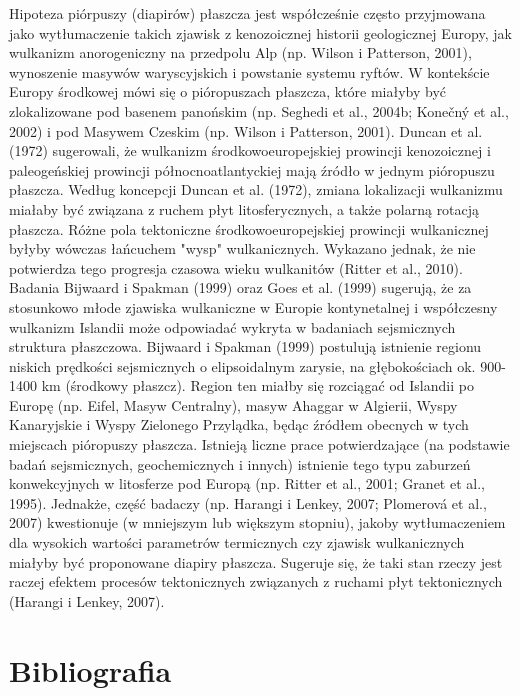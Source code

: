 \documentclass[11.5pt,twoside]{report}
\begin{document}
Hipoteza piórpuszy (diapirów) płaszcza jest współcześnie często przyjmowana jako wytłumaczenie takich zjawisk z kenozoicznej historii geologicznej Europy, jak wulkanizm anorogeniczny na przedpolu Alp (np. Wilson i Patterson, 2001), wynoszenie masywów waryscyjskich i powstanie systemu ryftów. W kontekście Europy środkowej mówi się o pióropuszach płaszcza, które miałyby być zlokalizowane pod basenem panońskim (np. Seghedi et al., 2004b; Konečn\'{y} et al., 2002) i pod Masywem Czeskim (np. Wilson i Patterson, 2001). Duncan et al. (1972) sugerowali, że wulkanizm środkowoeuropejskiej prowincji kenozoicznej i paleogeńskiej prowincji północnoatlantyckiej mają \'{z}ródło w jednym pióropuszu płaszcza. Według koncepcji Duncan et al. (1972), zmiana lokalizacji wulkanizmu miałaby być związana z ruchem płyt litosferycznych, a także polarną rotacją płaszcza. Różne pola tektoniczne środkowoeuropejskiej prowincji wulkanicznej byłyby wówczas łańcuchem "wysp" wulkanicznych. Wykazano jednak, że nie potwierdza tego progresja czasowa wieku wulkanitów (Ritter et al., 2010). Badania Bijwaard i Spakman (1999) oraz Goes et al. (1999) sugerują, że za stosunkowo młode zjawiska wulkaniczne w Europie kontynetalnej i współczesny wulkanizm Islandii może odpowiadać wykryta w badaniach sejsmicznych struktura płaszczowa. Bijwaard i Spakman (1999) postulują istnienie regionu niskich prędkości sejsmicznych o elipsoidalnym zarysie, na głębokościach ok. 900-1400 km (środkowy płaszcz). Region ten miałby się rozciągać od Islandii po Europę (np. Eifel, Masyw Centralny), masyw Ahaggar w Algierii, Wyspy Kanaryjskie i Wyspy Zielonego Przylądka, będąc \'{z}ródłem obecnych w tych miejscach pióropuszy płaszcza. Istnieją liczne prace potwierdzające (na podstawie badań sejsmicznych, geochemicznych i innych) istnienie tego typu zaburzeń konwekcyjnych w litosferze pod Europą (np. Ritter et al., 2001; Granet et al., 1995). Jednakże, część badaczy (np. Harangi i Lenkey, 2007; Plomerov\'{a} et al., 2007) kwestionuje (w mniejszym lub większym stopniu), jakoby wytłumaczeniem dla wysokich wartości parametrów termicznych czy zjawisk wulkanicznych miałyby być proponowane diapiry płaszcza. Sugeruje się, że taki stan rzeczy jest raczej efektem procesów tektonicznych związanych z ruchami płyt tektonicznych (Harangi i Lenkey, 2007). 

\chapter*{Bibliografia}
\end{document}
